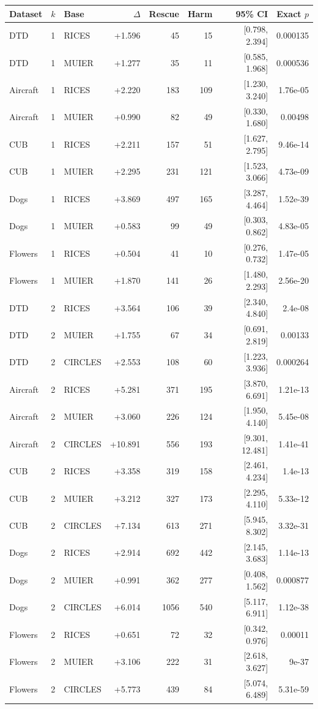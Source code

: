 \begin{tabular}{lllrrrrr}
\toprule
Dataset & $k$ & Base & $\Delta$ & Rescue & Harm & 95\% CI & Exact $p$ \\
\midrule
DTD & 1 & RICES & +1.596 & 45 & 15 & [0.798, 2.394] & 0.000135 \\
DTD & 1 & MUIER & +1.277 & 35 & 11 & [0.585, 1.968] & 0.000536 \\
Aircraft & 1 & RICES & +2.220 & 183 & 109 & [1.230, 3.240] & 1.76e-05 \\
Aircraft & 1 & MUIER & +0.990 & 82 & 49 & [0.330, 1.680] & 0.00498 \\
CUB & 1 & RICES & +2.211 & 157 & 51 & [1.627, 2.795] & 9.46e-14 \\
CUB & 1 & MUIER & +2.295 & 231 & 121 & [1.523, 3.066] & 4.73e-09 \\
Dogs & 1 & RICES & +3.869 & 497 & 165 & [3.287, 4.464] & 1.52e-39 \\
Dogs & 1 & MUIER & +0.583 & 99 & 49 & [0.303, 0.862] & 4.83e-05 \\
Flowers & 1 & RICES & +0.504 & 41 & 10 & [0.276, 0.732] & 1.47e-05 \\
Flowers & 1 & MUIER & +1.870 & 141 & 26 & [1.480, 2.293] & 2.56e-20 \\
DTD & 2 & RICES & +3.564 & 106 & 39 & [2.340, 4.840] & 2.4e-08 \\
DTD & 2 & MUIER & +1.755 & 67 & 34 & [0.691, 2.819] & 0.00133 \\
DTD & 2 & CIRCLES & +2.553 & 108 & 60 & [1.223, 3.936] & 0.000264 \\
Aircraft & 2 & RICES & +5.281 & 371 & 195 & [3.870, 6.691] & 1.21e-13 \\
Aircraft & 2 & MUIER & +3.060 & 226 & 124 & [1.950, 4.140] & 5.45e-08 \\
Aircraft & 2 & CIRCLES & +10.891 & 556 & 193 & [9.301, 12.481] & 1.41e-41 \\
CUB & 2 & RICES & +3.358 & 319 & 158 & [2.461, 4.234] & 1.4e-13 \\
CUB & 2 & MUIER & +3.212 & 327 & 173 & [2.295, 4.110] & 5.33e-12 \\
CUB & 2 & CIRCLES & +7.134 & 613 & 271 & [5.945, 8.302] & 3.32e-31 \\
Dogs & 2 & RICES & +2.914 & 692 & 442 & [2.145, 3.683] & 1.14e-13 \\
Dogs & 2 & MUIER & +0.991 & 362 & 277 & [0.408, 1.562] & 0.000877 \\
Dogs & 2 & CIRCLES & +6.014 & 1056 & 540 & [5.117, 6.911] & 1.12e-38 \\
Flowers & 2 & RICES & +0.651 & 72 & 32 & [0.342, 0.976] & 0.00011 \\
Flowers & 2 & MUIER & +3.106 & 222 & 31 & [2.618, 3.627] & 9e-37 \\
Flowers & 2 & CIRCLES & +5.773 & 439 & 84 & [5.074, 6.489] & 5.31e-59 \\
\bottomrule
\end{tabular}
